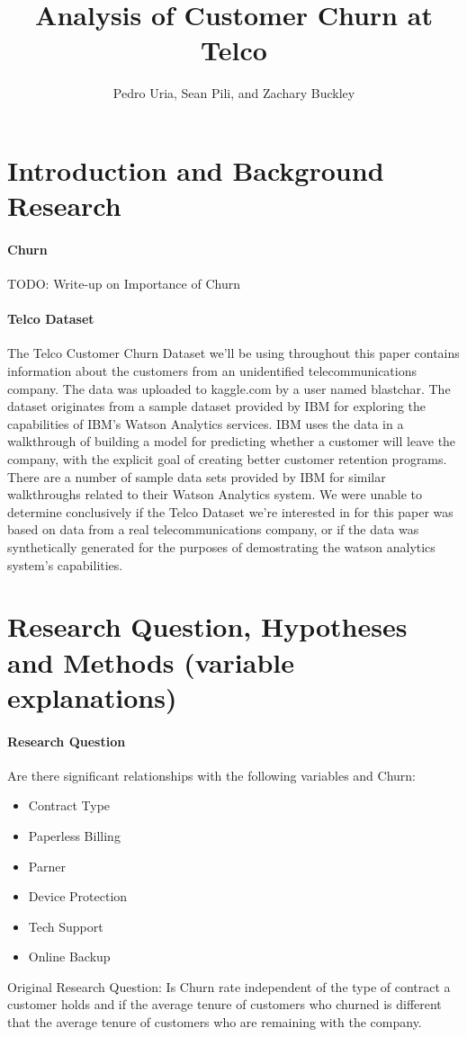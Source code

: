 \documentclass[man]{apa6}
\title{Analysis of Customer Churn at Telco}
\author{Pedro Uria, Sean Pili, and Zachary Buckley}
\affiliation{George Washington University}
\begin{document}
\maketitle

\section{Introduction and Background Research}
\paragraph{Churn}
TODO: Write-up on Importance of Churn

\paragraph{Telco Dataset}
The Telco Customer Churn Dataset we'll be using throughout this paper contains information about the customers from an unidentified telecommunications company. The data was uploaded to kaggle.com by a user named blastchar. \cite{blastchar_2018} The dataset originates from a sample dataset provided by IBM for exploring the capabilities of IBM's Watson Analytics services. IBM uses the data in a walkthrough of building a model for predicting whether a customer will leave the company, with the explicit goal of creating better customer retention programs. \cite{ibm_telco_2015} There are a number of sample data sets provided by IBM for similar walkthroughs related to their Watson Analytics system. \cite{ibm_data_2015} We were unable to determine conclusively if the Telco Dataset we're interested in for this paper was based on data from a real telecommunications company, or if the data was synthetically generated for the purposes of demostrating the watson analytics system's capabilities.

\section{Research Question, Hypotheses and Methods (variable explanations)}
\paragraph{Research Question}
Are there significant relationships with the following variables and Churn:
\begin{itemize}
\item{Contract Type}
\item{Paperless Billing}
\item{Parner}
\item{Device Protection}
\item{Tech Support}
\item{Online Backup}
\end{itemize}
Original Research Question:
Is Churn rate independent of the type of contract a customer holds and if the average tenure of customers who churned is different that the average tenure of customers who are remaining with the company.
\end{document}
